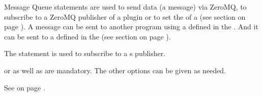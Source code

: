 Message Queue statements are used to send data (a message) via ZeroMQ,
to subscribe to a ZeroMQ publisher of a plugin or
to set the \HOST of a \SUBSCRIBE{} \MESSAGEQUEUE{}
(see section  on page \pageref{sec:opmessagequeue}).
A message can be sent to another program using a \MESSAGEQUEUE{} defined in the \OPERATOR.
And it can be sent to a \PLUGIN{} defined in the \UIMANAGER{}
(see section  on page \pageref{sec:uiplugin}).

The \SUBSCRIBE{} statement is used to subscribe to a \PLUGIN s publisher.

\MESSAGEQUEUE{} or \PLUGIN{} as well as \HEADER{} are mandatory. The other options
can be given as needed.

See 
on page \pageref{sec:opexamples:messagequeue:publishsubscribe}. \\[2ex]

